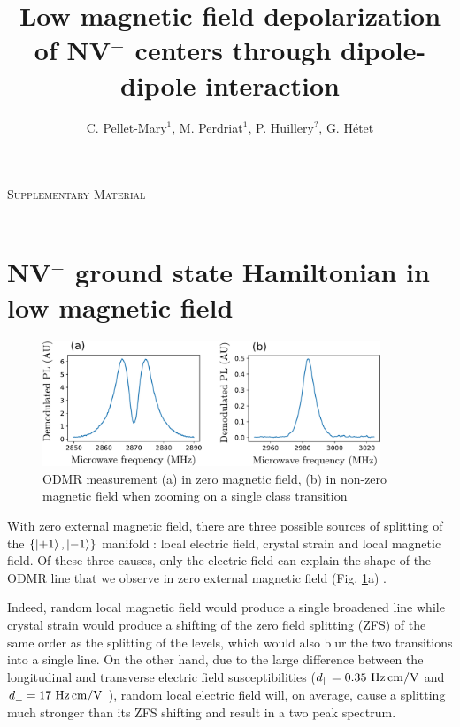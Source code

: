 \documentclass[preprintnumbers,amsmath,amssymb,onecolumn,12pt]{revtex4-2}\usepackage{graphicx}%
\begin{document}
\vspace{0.2in}
{\Large \hspace{1.6in}\textsc{Supplementary Material} }\\
\
\title{Low magnetic field depolarization of NV$^-$ centers through dipole-dipole interaction}

\author{C. Pellet-Mary$^1$, M. Perdriat$^1$, P. Huillery$^?$,  G. H\'etet} 


\maketitle

\tableofcontents

\section{NV$^-$ ground state Hamiltonian in low magnetic field}
\label{sec Hamiltonian}
\begin{figure}
\includegraphics[width=0.9\textwidth]{Figures_SI/fig_ESR}
\caption{ODMR measurement (a) in zero magnetic field, (b) in non-zero magnetic field when zooming on a single class transition}
\label{ESR_single_spin}
\end{figure}
With zero external magnetic field, there are three possible sources of splitting of the $\{\ket{+1},\ket{-1}\}$ manifold : local electric field, crystal strain and local magnetic field. Of these three causes, only the electric field can explain the shape of the ODMR line that we observe in zero external magnetic field (Fig. \ref{ESR_single_spin}a) \cite{mittiga2018imaging}.

Indeed, random local magnetic field would produce a single broadened line while crystal strain would produce a shifting of the zero field splitting (ZFS) of the same order as the splitting of the levels, which would also blur the two transitions into a single line. On the other hand, due to the large difference between the longitudinal and transverse electric field susceptibilities ($d_\parallel = 0.35\ \rm Hz\, cm/V$ and $d_\perp = 17\ \rm Hz\, cm/V$ \cite{van1990electric}), random local electric field will, on average, cause a splitting much stronger than its ZFS shifting and result in a two peak spectrum.
\end{document}
